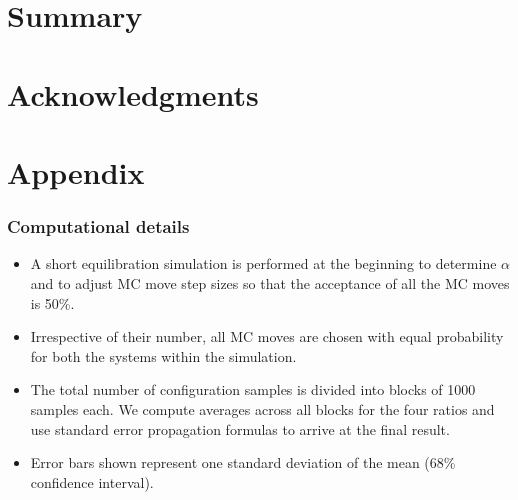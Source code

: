 \documentclass[xcolor=svgnames]{beamer}
\begin{document}
	\section{Summary}
	\section*{Acknowledgments}
    \section*{Appendix}
        \begin{frame}
            \frametitle{Computational details}
            \begin{itemize}
                \item A short equilibration simulation is performed at the beginning to determine $\alpha$ and to adjust MC move step sizes so that the acceptance of all the MC moves is 50\%.
                \item Irrespective of their number, all MC moves are chosen with equal probability for both the systems within the simulation.
                \item The total number of configuration samples is divided into blocks of 1000 samples each. We compute averages across all blocks for the four ratios and use standard error propagation formulas to arrive at the final result.
                \item Error bars shown represent one standard deviation of the mean (68\% confidence interval).
            \end{itemize}
        \end{frame}
    \iffalse
\end{document}
